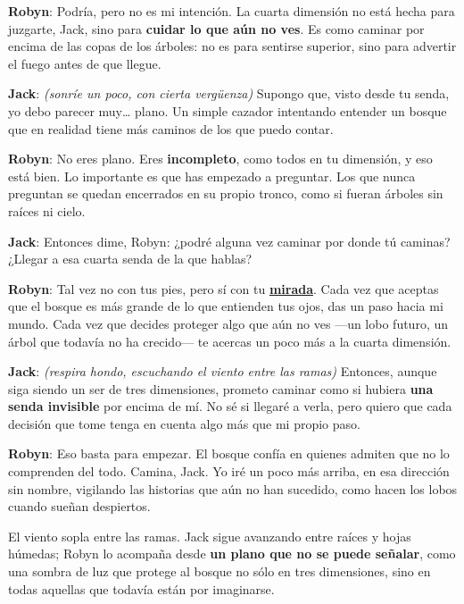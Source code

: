 \documentclass{article}
\begin{document}
\medskip

\noindent\textcolor{Cinnabar}{\textbf{Robyn}}:\quad
Podría, pero no es mi intención.  
La cuarta dimensión no está hecha para juzgarte, Jack,  
sino para \textcolor{Surfie Green}{\textbf{cuidar lo que aún no ves}}.  
Es como caminar por encima de las copas de los árboles: no es para sentirse superior,  
sino para advertir el fuego antes de que llegue.

\medskip

\noindent\textcolor{Cerulean}{\textbf{Jack}}:\quad
\emph{(sonríe un poco, con cierta vergüenza)}  
Supongo que, visto desde tu senda, yo debo parecer muy… plano.  
Un simple cazador intentando entender un bosque que en realidad tiene más caminos de los que puedo contar.

\medskip

\noindent\textcolor{Cinnabar}{\textbf{Robyn}}:\quad
No eres plano.  
Eres \textbf{incompleto}, como todos en tu dimensión, y eso está bien.  
Lo importante es que has empezado a preguntar.  
Los que nunca preguntan se quedan encerrados en su propio tronco,  
como si fueran árboles sin raíces ni cielo.

\medskip

\noindent\textcolor{Cerulean}{\textbf{Jack}}:\quad
Entonces dime, Robyn:  
¿podré alguna vez caminar por donde tú caminas?  
¿Llegar a esa cuarta senda de la que hablas?

\medskip

\noindent\textcolor{Cinnabar}{\textbf{Robyn}}:\quad
Tal vez no con tus pies, pero sí con tu \underline{\textbf{mirada}}.  
Cada vez que aceptas que el bosque es más grande de lo que entienden tus ojos,  
das un paso hacia mi mundo.  
Cada vez que decides proteger algo que aún no ves —un lobo futuro, un árbol que todavía no ha crecido—  
te acercas un poco más a la cuarta dimensión.

\medskip

\noindent\textcolor{Cerulean}{\textbf{Jack}}:\quad
\emph{(respira hondo, escuchando el viento entre las ramas)}  
Entonces, aunque siga siendo un ser de tres dimensiones,  
prometo caminar como si hubiera \textcolor{brightturquoise}{\textbf{una senda invisible}} por encima de mí.  
No sé si llegaré a verla, pero quiero que cada decisión que tome tenga en cuenta algo más que mi propio paso.

\medskip

\noindent\textcolor{Cinnabar}{\textbf{Robyn}}:\quad
Eso basta para empezar.  
El bosque confía en quienes admiten que no lo comprenden del todo.  
Camina, Jack.  
Yo iré un poco más arriba, en esa dirección sin nombre,  
vigilando las historias que aún no han sucedido, como hacen los lobos cuando sueñan despiertos.

\medskip

El viento sopla entre las ramas.  
Jack sigue avanzando entre raíces y hojas húmedas;  
Robyn lo acompaña desde \textcolor{Elephant}{\textbf{un plano que no se puede señalar}},  
como una sombra de luz que protege al bosque no sólo en tres dimensiones,  
sino en todas aquellas que todavía están por imaginarse.
\end{document}
